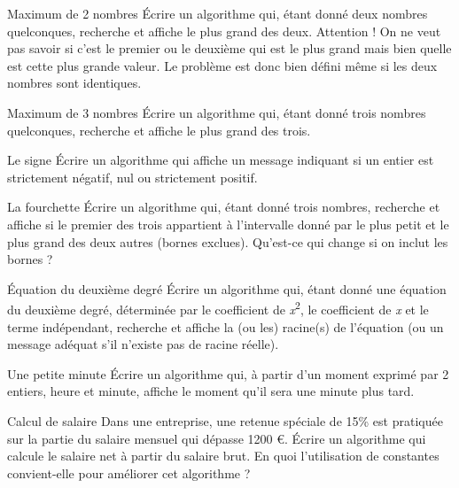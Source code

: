 \begin{Exercice}{Maximum de 2 nombres}
Écrire un algorithme qui, étant donné deux nombres quelconques,
recherche et affiche le plus grand des deux. Attention ! On ne veut
pas savoir si c'est le premier ou le deuxième qui est
le plus grand mais bien quelle est cette plus grande valeur. Le
problème est donc bien défini même si les deux nombres sont
identiques.
\end{Exercice}

\begin{Exercice}{Maximum de 3 nombres}
Écrire un algorithme qui, étant donné trois nombres quelconques,
recherche et affiche le plus grand des trois.
\end{Exercice}

\begin{Exercice}{Le signe}
Écrire un algorithme qui affiche un message indiquant
si un entier est strictement négatif, nul ou strictement
positif.
\end{Exercice}

\begin{Exercice}{La fourchette}
{
Écrire un algorithme qui, étant donné trois nombres, recherche et
affiche si le premier des trois appartient à l’intervalle donné par le
plus petit et le plus grand des deux autres (bornes exclues). Qu’est-ce
qui change si on inclut les bornes ?}
\end{Exercice}

\begin{Exercice}{Équation du deuxième degré}
{Écrire un algorithme qui, étant donné une
équation du deuxième degré, déterminée par le coefficient de
{\textit{x}}{\textsuperscript{2}},
le coefficient de
{\textit{x}} et le
terme indépendant, recherche et affiche la (ou les) racine(s) de
l’équation (ou un message adéquat s'il
n'existe pas de racine réelle).}
\end{Exercice}

\begin{Exercice}{Une petite minute}
{Écrire un algorithme qui, à partir d'un moment exprimé par 2 entiers, 
heure et minute, affiche le moment qu'il sera une minute plus tard.}
\end{Exercice}

\begin{Exercice}{Calcul de salaire}
{
Dans une entreprise, une retenue spéciale de 15\% est pratiquée sur la
partie du salaire mensuel qui dépasse 1200 €. Écrire un algorithme qui
calcule le salaire net à partir du salaire brut. En quoi l’utilisation
de constantes convient-elle pour améliorer cet algorithme ?}
\end{Exercice}


